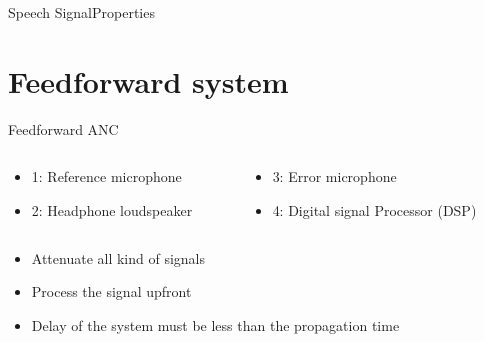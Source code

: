 \begin{frame}{Speech Signal}{Properties}
\section{Feedforward system}
\begin{frame}{Feedforward ANC}
	\begin{columns}	
			\begin{column}{0.5\textwidth}
			\begin{itemize}
			\item 1: Reference microphone
			\item 2: Headphone loudspeaker
			\end{itemize}
			\end{column}		
	\begin{column}{0.5\textwidth} 
	\begin{itemize}
			\item 3: Error microphone
			\item 4: Digital signal Processor (DSP)
	\end{itemize}
	\end{column}	
	\end{columns}	
	
	\begin{itemize}
			\item Attenuate all kind of signals
			\item Process the signal upfront
			\item Delay of the system must be less than the propagation time
	\end{itemize}		
\end{frame}


\end{frame}

